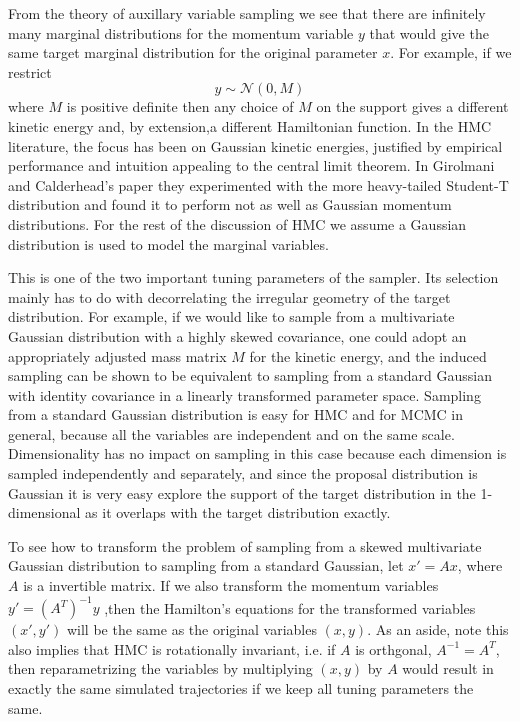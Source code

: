 \documentclass{book}
\begin{document}
\begin{enumerate}
From the theory of auxillary variable sampling we see that there are infinitely
many marginal distributions for the momentum variable $y$ that would give the
same target marginal distribution for the original parameter $x$. For example,
if we restrict 
\[ y \sim \mathcal{N}(0,M) \]
where $M$ is positive definite then any choice of $M$ on the support gives a
different kinetic energy and, by extension,a different Hamiltonian function. In the HMC
literature, the focus has been on Gaussian kinetic energies, 
justified by empirical performance and intuition appealing to the central limit
theorem. In Girolmani and Calderhead's paper \cite{girolami2011riemann} they experimented
with the more heavy-tailed Student-T distribution and found it to perform not as
well
as Gaussian momentum distributions. For the rest of the discussion of HMC we
assume a Gaussian distribution is used to model the marginal variables.

This is one of the two important tuning parameters of the sampler. Its
selection mainly has to do with decorrelating the irregular geometry of the
target distribution. For example, if we would like to sample from a multivariate
Gaussian distribution with a highly skewed covariance, one could adopt an
appropriately adjusted mass
matrix $M$ for the kinetic energy, and the induced sampling can be shown to be
equivalent to sampling from a standard Gaussian with identity covariance in a
linearly transformed parameter space. Sampling from a standard Gaussian
distribution is easy
for HMC and for MCMC in general, because all the variables are independent and on
the same scale. Dimensionality has no impact on sampling in this case because
each dimension is sampled independently and separately, and since the proposal
distribution is Gaussian it is very easy explore the support of the target
distribution in the 1-dimensional as it overlaps with the target distribution
exactly. 

To see how to transform the problem of sampling from a skewed multivariate
Gaussian distribution to sampling from a standard Gaussian, let $x' = Ax$, where $A$ is a invertible matrix. If we also
transform the momentum variables $y' = (A^T)^{-1}y$ ,then the
Hamilton's equations for the transformed variables $(x',y')$ will be the same as
the original variables $(x,y)$. As an aside, note this also implies that HMC is rotationally
invariant, i.e. if $A$ is orthgonal, $A^{-1} = A^T$, then reparametrizing the
variables by  multiplying $(x,y)$ by $A$ would result in exactly the same simulated
trajectories if we keep all tuning parameters the same.


\end{enumerate}
\end{document}
